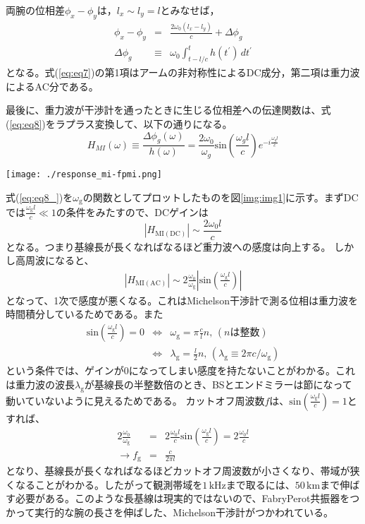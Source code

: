 両腕の位相差$\phi_{x}-\phi_{y}$は，$l_x\sim l_y=l$とみなせば，
\begin{eqnarray}\label{eq:eq7}
  \phi_{{x}}-\phi_{{y}} &=& \frac{2\omega_{0}(l_{x}-l_{y})}{c} + \Delta{\phi_{g}} \\ \label{eq:eq7}
  \Delta{\phi_{g}} &\equiv& \omega_{0}\int_{t-l/c}^{t} h(t^{\prime})\, dt^{\prime} \label{eq:eq8}
\end{eqnarray}
となる。式(\ref{eq:eq7})の第1項はアームの非対称性によるDC成分，第二項は重力波によるAC分である。


最後に、重力波が干渉計を通ったときに生じる位相差への伝達関数は、式(\ref{eq:eq8})をラプラス変換して、以下の通りになる。
\begin{equation}\label{eq:eq8_}
  \boxed{H_{MI}(\omega) \equiv \frac{\Delta{\phi_{g}(\omega)}}{h(\omega)} = \frac{2\omega_{0}}{\omega_{g}}\mathrm{sin}(\frac{\omega_{g}{l}}{c})e^{-i\frac{\omega_{g}{l}}{c}} }
\end{equation}

\begin{center}\label{img:img1}
\texttt{[image: ./response\_mi-fpmi.png]}
\end{center}


式(\ref{eq:eq8_})を$\omega_{\mathrm{g}}$の関数としてプロットしたものを図\ref{img:img1}に示す。まずDCでは$\frac{\omega_{\mathrm{g}}l}{c}\ll1$の条件をみたすので、DCゲインは
\begin{equation}
  |H_{\mathrm{MI(DC)}}|\sim\frac{2\omega_{0}l}{c}
\end{equation}
となる。つまり基線長が長くなればなるほど重力波への感度は向上する。
しかし高周波になると、
\begin{eqnarray}
  |H_{\mathrm{MI(AC)}}| \sim 2\frac{\omega_{0}}{\omega_{\mathrm{g}}}|\mathrm{sin}(\frac{\omega_{\mathrm{g}}l}{c})|
\end{eqnarray}
となって、1次で感度が悪くなる。これはMichelson干渉計で測る位相は重力波を時間積分しているためである。また
\begin{eqnarray}
  \mathrm{sin}(\frac{\omega_{\mathrm{g}}l}{c})=0 &\Leftrightarrow& \omega_{\mathrm{g}} = \pi\frac{c}{l}n, \, (nは整数)\\
 &\Leftrightarrow& \lambda_{\mathrm{g}} = \frac{l}{2} n, \,(\lambda_{\mathrm{g}} \equiv 2\pi{c}/\omega_{\mathrm{g}})
\end{eqnarray}
という条件では、ゲインが0になってしまい感度を持たないことがわかる。これは重力波の波長$\lambda_{\mathrm{g}}$が基線長の半整数倍のとき、BSとエンドミラーは節になって動いていないように見えるためである。
カットオフ周波数$f$は、$\mathrm{sin}(\frac{\omega_{\mathrm{g}}l}{c})=1$とすれば、
\begin{eqnarray}
  2\frac{\omega_{0}}{\omega_{\mathrm{g}}} &=& 2\frac{\omega_{0}l}{c}\mathrm{sin}(\frac{\omega_{\mathrm{g}}l}{c})=2\frac{\omega_{0}l}{c} \\
  \rightarrow f_{\mathrm{g}} &=& \frac{c}{2\pi{l}}
\end{eqnarray}
となり、基線長が長くなればなるほどカットオフ周波数が小さくなり、帯域が狭くなることがわかる。したがって観測帯域を$1\,\mathrm{kHz}$まで取るには、$50\, \mathrm{km}$まで伸ばす必要がある。このような長基線は現実的ではないので、FabryPerot共振器をつかって実行的な腕の長さを伸ばした、Michelson干渉計がつかわれている。


